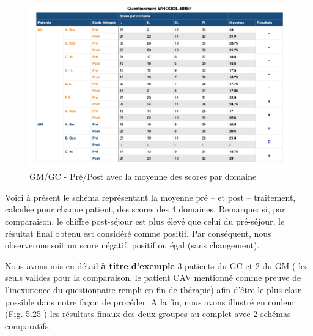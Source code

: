\begin{figure}
\centering
\includegraphics[width=\linewidth]{images/graphiques/questionnaire_wq.png}
\caption[Questionnaire WHO QOL-BREF]{GM/GC - Pré/Post avec la moyenne des scores par domaine}

\end{figure}
Voici à présent le schéma représentant la
moyenne pré -- et post -- traitement, calculée pour chaque patient, des scores
des 4 domaines.
Remarque: si, par comparaison, le chiffre post-séjour est plus élevé
que celui du
pré-séjour, le résultat final obtenu est considéré comme
positif. Par conséquent, nous
observerons soit un score négatif, positif ou égal (sans changement).


Nous avons mis en détail  \textbf{à titre d'exemple } 3 patients du GC et 2 du GM
( les seuls valides pour la comparaison, le patient CAV mentionné comme preuve de l'inexistence du questionnaire rempli en fin de thérapie) afin d'être le plus clair possible
dans notre façon de procéder.
A la fin, nous avons illustré en couleur (Fig. 5.25 ) les
résultats finaux des deux groupes au complet avec 2 schémas
comparatifs.
